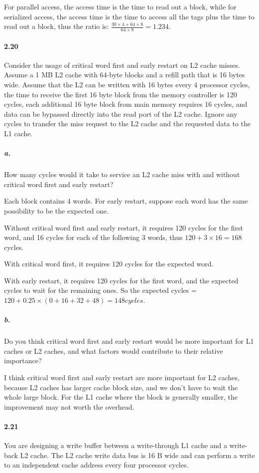 \documentclass{article}
\begin{document}
For parallel access, the access time is the time to read out a block, while for serialized access, the access time is the time to access all the tags plus the time to read out a block, thus the ratio is: $\frac{30\times4+64\times8}{64\times8}=1.234$.

\paragraph{2.20} Consider the usage of critical word first and early restart on L2 cache misses. Assume a 1 MB L2 cache with 64-byte blocks and a refill path that is 16 bytes wide. Assume that the L2 can be written with 16 bytes every 4 processor cycles, the time to receive the first 16 byte block from the memory controller is 120 cycles, each additional 16 byte block from main memory requires 16 cycles, and data can be bypassed directly into the read port of the L2 cache. Ignore any cycles to transfer the miss request to the L2 cache and the requested data to the L1 cache.

\subparagraph{a.} How many cycles would it take to service an L2 cache miss with and without critical word first and early restart?

Each block contains 4 words. For early restart, suppose each word has the same possibility to be the expected one.

Without critical word first and early restart, it requires 120 cycles for the first word, and 16 cycles for each of the following 3 words, thus $120+3\times16=168$ cycles.

With critical word first, it requires 120 cycles for the expected word.

With early restart, it requires 120 cycles for the first word, and the expected cycles to wait for the remaining ones. So the expected cycles = $120 + 0.25\times(0 + 16 + 32 + 48) = 148 cycles$.

\subparagraph{b.} Do you think critical word first and early restart would be more important for L1 caches or L2 caches, and what factors would contribute to their relative importance?

I think critical word first and early restart are more important for L2 caches, because L2 caches has larger cache block size, and we don't have to wait the whole large block. For the L1 cache where the block is generally smaller, the improvement may not worth the overhead.

\paragraph{2.21} You are designing a write buffer between a write-through L1 cache and a write-back L2 cache. The L2 cache write data bus is 16 B wide and can perform a write to an independent cache address every four processor cycles.
\end{document}
